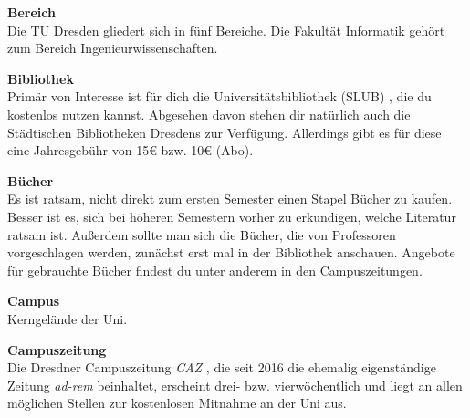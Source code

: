 \begin{multicols}{2}

\textbf{Bereich} \\
Die TU Dresden gliedert sich in fünf Bereiche.
Die Fakultät Informatik gehört zum Bereich Ingenieurwissenschaften.


\textbf{Bibliothek} \\
Primär von Interesse ist für dich die Universitätsbibliothek (SLUB) , die du kostenlos nutzen kannst.
Abgesehen davon stehen dir natürlich auch die Städtischen Bibliotheken Dresdens zur Verfügung.
Allerdings gibt es für diese eine Jahresgebühr von 15\euro{} bzw. 10\euro{} (Abo).

\vfill\columnbreak

\textbf{Bücher} \\
Es ist ratsam, nicht direkt zum ersten Semester einen Stapel Bücher zu kaufen.
Besser ist es, sich bei höheren Semestern vorher zu erkundigen, welche Literatur ratsam ist.
Außerdem sollte man sich die Bücher, die von Professoren vorgeschlagen werden, zunächst erst mal in der Bibliothek anschauen.
Angebote für gebrauchte Bücher findest du unter anderem in den Campuszeitungen.

\textbf{Campus} \\
Kerngelände der Uni.

\textbf{Campuszeitung} \\
Die Dresdner Campuszeitung \textit{CAZ} , die seit 2016 die ehemalig eigenständige Zeitung \textit{ad-rem} beinhaltet, erscheint drei- bzw. vierwöchentlich und liegt an allen möglichen Stellen zur kostenlosen Mitnahme an der Uni aus.


\end{multicols}
